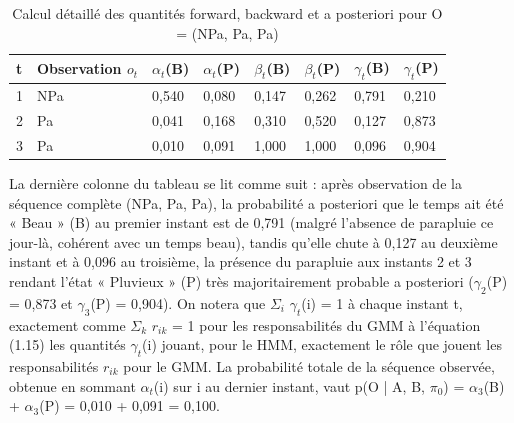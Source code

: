 \begin{table}[H]
\centering
\small
\setlength{\tabcolsep}{0.09cm}
\begin{tabular}{|p{1.71cm}|p{1.71cm}|p{1.71cm}|p{1.71cm}|p{1.71cm}|p{1.71cm}|p{1.71cm}|p{1.71cm}|}
\hline
\textbf{t} & \textbf{Observation $o_{t}$} & \textbf{$\alpha _{t}$(B)} & \textbf{$\alpha _{t}$(P)} & \textbf{$\beta _{t}$(B)} & \textbf{$\beta _{t}$(P)} & \textbf{$\gamma _{t}$(B)} & \textbf{$\gamma _{t}$(P)} \\
\hline
1 & NPa & 0,540 & 0,080 & 0,147 & 0,262 & 0,791 & 0,210 \\
\hline
2 & Pa & 0,041 & 0,168 & 0,310 & 0,520 & 0,127 & 0,873 \\
\hline
3 & Pa & 0,010 & 0,091 & 1,000 & 1,000 & 0,096 & 0,904 \\
\hline
\end{tabular}
\caption{Calcul détaillé des quantités forward, backward et a posteriori pour O = (NPa, Pa, Pa)}
\label{tab:1_4}
\end{table}
La dernière colonne du tableau se lit comme suit : après observation de la séquence complète (NPa, Pa, Pa), la probabilité a posteriori que le temps ait été « Beau » (B) au premier instant est de 0,791 (malgré l'absence de parapluie ce jour-là, cohérent avec un temps beau), tandis qu'elle chute à 0,127 au deuxième instant et à 0,096 au troisième, la présence du parapluie aux instants 2 et 3 rendant l'état « Pluvieux » (P) très majoritairement probable a posteriori ($\gamma _{2}$(P) = 0,873 et $\gamma _{3}$(P) = 0,904). On notera que $\Sigma _{i}$ $\gamma _{t}$(i) = 1 à chaque instant t, exactement comme $\Sigma _{k}$ $r_{ik}$ = 1 pour les responsabilités du GMM à l'équation (1.15)  les quantités $\gamma _{t}$(i) jouant, pour le HMM, exactement le rôle que jouent les responsabilités $r_{ik}$ pour le GMM. La probabilité totale de la séquence observée, obtenue en sommant $\alpha _{t}$(i) sur i au dernier instant, vaut p(O | A, B, $\pi _{0}$) = $\alpha _{3}$(B) + $\alpha _{3}$(P) = 0,010 + 0,091 = 0,100.

